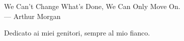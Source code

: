 \cleardoublepage
{}
\thispagestyle{empty}

\vspace*{3cm}

\begin{center}
    We Can’t Change What's Done, We Can Only Move On. \\ \medskip
    --- Arthur Morgan
\end{center}

\medskip

\begin{center}
    Dedicato ai miei genitori, sempre al mio fianco.
\end{center}
